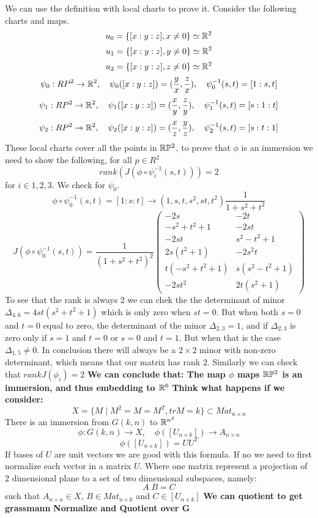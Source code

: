 \documentclass[11pt,a4paper]{report}
\begin{document}
We can use the definition with local charts to prove it. 
Consider the following charts and maps.
$$ u_0 =  \{ [x:y:z], x \neq 0 \} \simeq \mathbb{R}^2  $$
$$ u_1 =  \{ [x:y:z], y \neq 0 \} \simeq \mathbb{R}^2  $$
$$ u_2 = \{ [x:y:z], z \neq 0 \} \simeq \mathbb{R}^2  $$
$$ \psi_0: RP^2 \to \mathbb{R}^2, \quad
\psi_0([x:y:z]) = (\frac{y}{x}, \frac{z}{x}), \quad
\psi_0^{-1}(s,t) = [1:s,t]
$$
$$ \psi_1: RP^2 \to \mathbb{R}^2, \quad
\psi_1([x:y:z]) = (\frac{x}{y}, \frac{z}{y}), \quad
\psi_1^{-1}(s,t) = [s:1:t]
$$
$$ \psi_2: RP^2 \to \mathbb{R}^2, \quad
\psi_2([x:y:z]) = (\frac{x}{z}, \frac{y}{z}), \quad
\psi_2^{-1}(s,t) = [s:t:1]
$$
These local charts cover all the points in $\mathbb{R} \mathbb{P} ^2$, to prove that $\phi$ is an immersion
we need to show the following, for all $p \in R^2$
$$ rank(J(\phi \circ \psi_i^{-1}(s,t))) = 2 $$
for $i \in {1,2,3}$.
\newline
We check for $\psi_0$.
$$\phi \circ \psi_0^{-1}(s,t) = [1:s:t] \to (1,s,t,s^2,st,t^2) \frac{1}{1+s^2+t^2} $$
$$ J(\phi \circ \psi_0^{-1}(s,t)) = \frac{1}{(1+s^2+t^2)^2} 
\begin{pmatrix}
-2s & -2t \\
-s^2+t^2+1 & -2st \\
-2st & s^2-t^2+1 \\
2s (t^2+1) & -2 s^2 t \\
t (-s^2 + t^2 +1 ) & s (s^2 - t^2 + 1) \\
-2st^2 & 2t(s^2+1)
\end{pmatrix} 
$$
To see that the rank is always $2$ we can chek the the determinant of minor  $\Delta_{4,6} = 4 s t (s^2 + t^2 + 1)$ which is only zero when $st=0$.
But when both $s =0$ and  $t=0$ equal to zero, the determinant of the minor $\Delta_{2,3} = 1$, and if $\Delta_{2,3}$ is zero only if $s=1$ and $t=0$ or $s=0$ and $t=1$. 
But when that is the case $\Delta_{1,5} \neq 0 $. In conclusion there will always be a $2 \times 2$ minor with non-zero determinant, which means that our matrix has rank $2$.
Similarly we can check that $rank J(\phi_i) = 2$
\newline
\textbf{We can conclude that: The map $\phi$ maps $\mathbb{R} \mathbb{P} ^2$ is an immersion, and thus embedding to $\mathbb{R}^6$}
\newline
\textbf{Think what happens if we consider:}
$$ X = \{ M \; | \; M^2 = M = M^T, trM = k \} \subset Mat_{n \times n} $$
There is an immersion from $G(k,n)$ to $\mathbb{R}^{n^2}$
$$ \phi: G(k,n) \to X, \quad \phi([U_{n \times k}]) \to A_{n \times n}  $$
$$ \phi([U_{n \times k}]) = U U^T  $$
If bases of $U$ are unit vectors we are good with this formula. If no we need to first normalize each vector in a matrix $U$.
Where one matrix represent a projection of $2$ dimensional plane to a set of two dimensional subspaces, namely:
$$ A \; B  = C  $$
such that $A_{n \times n} \in X$, $ B \in Mat_{n \times k}$ and 
$ C \in [U_{n\times k}] $
\textbf{We can quotient to get grassmann}
\textbf{Normalize and Quotient over G}
\newline
\cite{HuangWG16}
\cite{DBLP}

 
\end{document}
